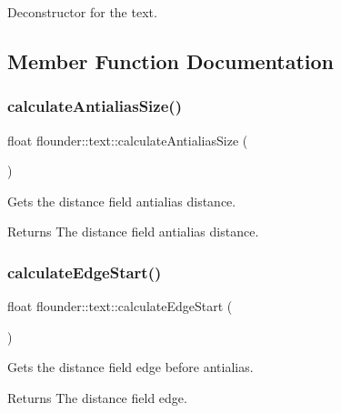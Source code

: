 Deconstructor for the text. 



\subsection{Member Function Documentation}
\mbox{\label{classflounder_1_1text_ade6f72f44e758528317072049dfc9248}} 
\subsubsection{\texorpdfstring{calculate\+Antialias\+Size()}{calculateAntialiasSize()}}
{\footnotesize\ttfamily float flounder\+::text\+::calculate\+Antialias\+Size (\begin{DoxyParamCaption}{ }\end{DoxyParamCaption})}



Gets the distance field antialias distance. 

\begin{DoxyReturn}{Returns}
The distance field antialias distance. 
\end{DoxyReturn}
\mbox{\label{classflounder_1_1text_a2a2ae8e21f3813120d01664ae1f6b946}} 
\subsubsection{\texorpdfstring{calculate\+Edge\+Start()}{calculateEdgeStart()}}
{\footnotesize\ttfamily float flounder\+::text\+::calculate\+Edge\+Start (\begin{DoxyParamCaption}{ }\end{DoxyParamCaption})}



Gets the distance field edge before antialias. 

\begin{DoxyReturn}{Returns}
The distance field edge. 
\end{DoxyReturn}
\mbox{\label{classflounder_1_1text_a9b6ae8abc8233838a5fc164845c87cde}} 
